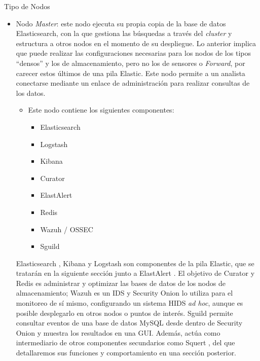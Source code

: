     \begin{subsubsection}{Tipo de Nodos}
        \begin{itemize}
          \item Nodo \textit{Master}: este nodo ejecuta su propia copia de la base de datos Elasticsearch, con la que gestiona las búsquedas a través del \textit{cluster} y estructura a otros nodos en el momento de su despliegue. Lo anterior implica que puede realizar las configuraciones necesarias para los nodos de los tipos “densos” y los de almacenamiento, pero no los de sensores o \textit{Forward}, por carecer estos últimos de una pila Elastic. Este nodo permite a un analista conectarse mediante un enlace de administración para realizar consultas de los datos.
          \begin{itemize}
              \item  Este nodo contiene los siguientes componentes:
              \begin{itemize}
                  \item Elasticsearch \cite{elastic}
                  \item Logstash \cite{elastic}
                  \item Kibana \cite{elastic}
                  \item Curator \cite{curator}
                  \item ElastAlert \cite{elasalert}
                  \item Redis \cite{redis}
                  \item Wazuh \cite{wazuh} / OSSEC \cite{ossec}
                  \item Sguild \cite{sguil}
              \end{itemize}
          \end{itemize}
          Elasticsearch \cite{elastic}, Kibana \cite{elastic} y Logstash \cite{elastic} son componentes de la pila Elastic, que se tratarán en la siguiente sección junto a ElastAlert \cite{elasalert}. El objetivo de Curator \cite{curator} y Redis \cite{redis} es administrar y optimizar las bases de datos de los nodos de almacenamiento; Wazuh \cite{wazuh} es un IDS y Security Onion lo utiliza para el monitoreo de sí mismo, configurando un sistema HIDS \textit{ad hoc}, aunque es posible desplegarlo en otros nodos o puntos de interés. Sguild \cite{sguil} permite consultar eventos de una base de datos MySQL desde dentro de Security Onion y muestra los resultados en una GUI. Además, actúa como intermediario de otros componentes secundarios como Squert \cite{squert}, del que detallaremos sus funciones y comportamiento en una sección posterior. 

\end{itemize}
\end{subsubsection}
